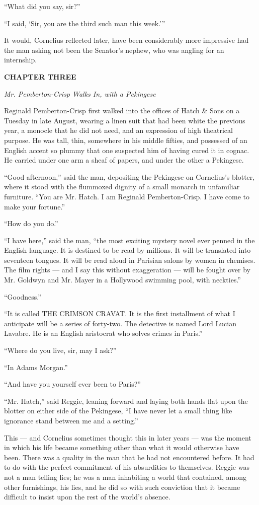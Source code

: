 \documentclass[12pt,openright]{book}
\begin{document}
“What did you say, sir?”

“I said, ‘Sir, you are the third such man this week.’”

It would, Cornelius reflected later, have been considerably more impressive had the man asking not been the Senator’s nephew, who was angling for an internship.

\textbf{CHAPTER THREE}

\textit{Mr. Pemberton-Crisp Walks In, with a Pekingese}

Reginald Pemberton-Crisp first walked into the offices of Hatch \& Sons on a Tuesday in late August, wearing a linen suit that had been white the previous year, a monocle that he did not need, and an expression of high theatrical purpose. He was tall, thin, somewhere in his middle fifties, and possessed of an English accent so plummy that one suspected him of having cured it in cognac. He carried under one arm a sheaf of papers, and under the other a Pekingese.

“Good afternoon,” said the man, depositing the Pekingese on Cornelius’s blotter, where it stood with the flummoxed dignity of a small monarch in unfamiliar furniture. “You are Mr. Hatch. I am Reginald Pemberton-Crisp. I have come to make your fortune.”

“How do you do.”

“I have here,” said the man, “the most exciting mystery novel ever penned in the English language. It is destined to be read by millions. It will be translated into seventeen tongues. It will be read aloud in Parisian salons by women in chemises. The film rights — and I say this without exaggeration — will be fought over by Mr. Goldwyn and Mr. Mayer in a Hollywood swimming pool, with neckties.”

“Goodness.”

“It is called THE CRIMSON CRAVAT. It is the first installment of what I anticipate will be a series of forty-two. The detective is named Lord Lucian Lavabre. He is an English aristocrat who solves crimes in Paris.”

“Where do you live, sir, may I ask?”

“In Adams Morgan.”

“And have you yourself ever been to Paris?”

“Mr. Hatch,” said Reggie, leaning forward and laying both hands flat upon the blotter on either side of the Pekingese, “I have never let a small thing like ignorance stand between me and a setting.”

This — and Cornelius sometimes thought this in later years — was the moment in which his life became something other than what it would otherwise have been. There was a quality in the man that he had not encountered before. It had to do with the perfect commitment of his absurdities to themselves. Reggie was not a man telling lies; he was a man inhabiting a world that contained, among other furnishings, his lies, and he did so with such conviction that it became difficult to insist upon the rest of the world’s absence.
\end{document}
